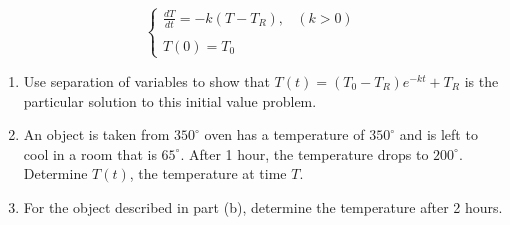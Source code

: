 \documentclass[12pt]{article}
\newif\ifans
\begin{document}
\begin{enumerate}
$$\left\{\begin{array}{ll}
\frac{dT}{dt}=-k(T-T_R), & (k >0)\\
&\\
T(0)=T_0 &
\end{array}\right.$$

\begin{enumerate}

\item Use separation of variables to show that $T(t)=(T_0-T_R)e^{-kt}+T_R$ is the particular solution to this initial value problem.

\item An object is taken from $350^{\circ}$ oven has a temperature of $350^{\circ}$ and is left to cool in a room that is $65^{\circ}$.  After 1 hour, the temperature drops to $200^{\circ}$.  Determine $T(t)$, the temperature at time $T$.

\ifans{\fbox{$T(t)=285\left(\frac{9}{19}\right)^t+65$}} \fi

\item For the object described in part (b), determine the temperature after 2 hours.

\ifans{\fbox{$T(2)=\frac{2450}{19}^{\circ}\approx 128.95^{\circ}$}} \fi

\end{enumerate}

\end{enumerate}
\end{document}

